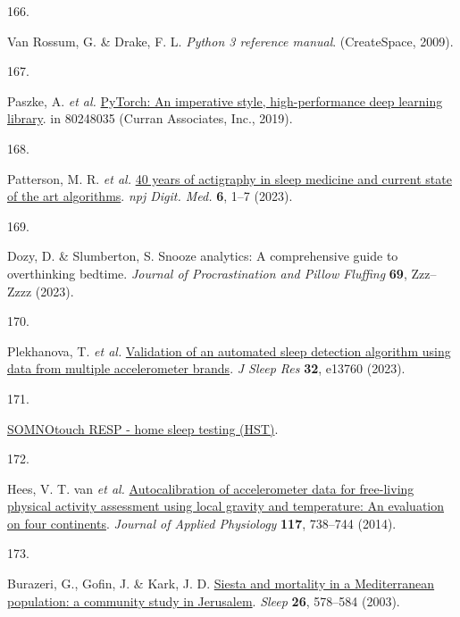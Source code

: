 \documentclass[
  10pt,
]{scrbook}
\newlength{\cslhangindent}
\newlength{\csllabelwidth}
\newlength{\cslentryspacingunit} %
\newenvironment{CSLReferences}[2] %
 {%
  \setlength{\parindent}{0pt}
  \ifodd #1
  \let\oldpar\par
  \def\par{\hangindent=\cslhangindent\oldpar}
  \fi
  \setlength{\parskip}{#2\cslentryspacingunit}
 }%
 {}
\newcommand{\CSLLeftMargin}[1]{\parbox[t]{\csllabelwidth}{#1}}
\newcommand{\CSLRightInline}[1]{\parbox[t]{\linewidth - \csllabelwidth}{#1}\break}
\let\originaltextbf\textbf
\renewcommand{\textbf}[1]{\textcolor{color1}{\textsf{\originaltextbf{#1}}}}
\begin{document}
\begin{CSLReferences}{0}{0}
\leavevmode{}%
\CSLLeftMargin{166. }%
\CSLRightInline{Van Rossum, G. \& Drake, F. L. \emph{Python 3 reference
manual}. (CreateSpace, 2009).}

\leavevmode{}%
\CSLLeftMargin{167. }%
\CSLRightInline{Paszke, A. \emph{et al.}
\href{http://papers.neurips.cc/paper/9015-pytorch-an-imperative-style-high-performance-deep-learning-library.pdf}{PyTorch:
An imperative style, high-performance deep learning library}. in
80248035 (Curran Associates, Inc., 2019).}

\leavevmode{}%
\CSLLeftMargin{168. }%
\CSLRightInline{Patterson, M. R. \emph{et al.}
\href{https://doi.org/10.1038/s41746-023-00802-1}{40 years of actigraphy
in sleep medicine and current state of the art algorithms}. \emph{npj
Digit. Med.} \textbf{6}, 1--7 (2023).}

\leavevmode{}%
\CSLLeftMargin{169. }%
\CSLRightInline{Dozy, D. \& Slumberton, S. Snooze analytics: A
comprehensive guide to overthinking bedtime. \emph{Journal of
Procrastination and Pillow Fluffing} \textbf{69}, Zzz--Zzzz (2023).}

\leavevmode{}%
\CSLLeftMargin{170. }%
\CSLRightInline{Plekhanova, T. \emph{et al.}
\href{https://doi.org/10.1111/jsr.13760}{Validation of an automated
sleep detection algorithm using data from multiple accelerometer
brands}. \emph{J Sleep Res} \textbf{32}, e13760 (2023).}

\leavevmode{}%
\CSLLeftMargin{171. }%
\CSLRightInline{\href{https://somnomedics.de/enus/somnomedics-diagnostic-devices/sleep-diagnostics/home-sleep-testing-hst/somnotouch-resp-home-sleep-testing-hst/}{SOMNOtouch{\texttrademark}
RESP - home sleep testing (HST)}.}

\leavevmode{}%
\CSLLeftMargin{172. }%
\CSLRightInline{Hees, V. T. van \emph{et al.}
\href{https://doi.org/10.1152/japplphysiol.00421.2014}{Autocalibration
of accelerometer data for free-living physical activity assessment using
local gravity and temperature: An evaluation on four continents}.
\emph{Journal of Applied Physiology} \textbf{117}, 738--744 (2014).}

\leavevmode{}%
\CSLLeftMargin{173. }%
\CSLRightInline{Burazeri, G., Gofin, J. \& Kark, J. D.
\href{https://doi.org/10.1093/sleep/26.5.578}{Siesta and mortality in a
Mediterranean population: a community study in Jerusalem}. \emph{Sleep}
\textbf{26}, 578--584 (2003).}


\end{CSLReferences}
\end{document}
